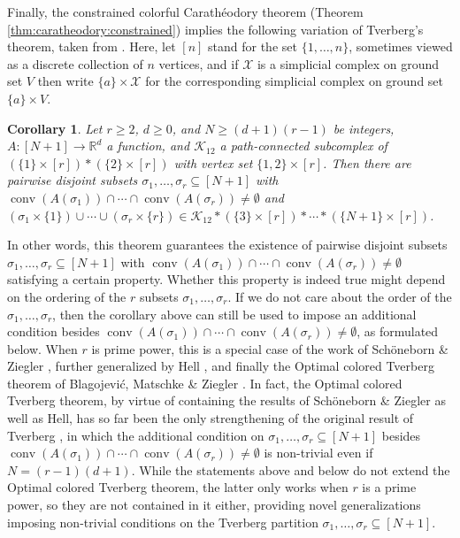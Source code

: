 \documentclass[a4paper,11pt,reqno, english]{amsart}
\newtheorem{corollary}[theorem]{Corollary}
\theoremstyle{definition}
\theoremstyle{remark}
\newcommand\R{\mathbb R}
\DeclareMathOperator{\conv}{\mathrm{conv}}
\begin{document}
Finally, the constrained colorful Carath\'eodory theorem (Theorem \ref{thm:caratheodory:constrained}) implies the following variation of Tverberg's theorem, taken from \cite[Corollary 1.7]{Blagojevic2025}. Here, let $[n]$ stand for the set $\{1,\ldots,n\}$, sometimes viewed as a discrete collection of $n$ vertices, and if $\mathscr{X}$ is a simplicial complex on ground set $V$ then write $\{a\}\times \mathscr{X}$ for the corresponding simplicial complex on ground set $\{a\}\times V$.
\begin{corollary}\label{crl:new-tverberg}
    Let $r\geq 2$, $d\geq 0$, and $N\geq (d+1)(r-1)$ be integers, $A\colon [N+1]\to\R^d$ a function, and $\mathscr{K}_{12}$ a path-connected subcomplex of $(\{1\}\times[r])*(\{2\}\times[r])$ with vertex set $\{1,2\}\times[r]$. Then there are pairwise disjoint subsets $\sigma_1,\ldots,\sigma_r\subseteq [N+1]$ with $\conv(A(\sigma_1))\cap\cdots\cap\conv(A(\sigma_r))\neq\emptyset$ and $(\sigma_1\times\{1\})\cup\cdots\cup(\sigma_r\times\{r\})\in\mathscr{K}_{12}*(\{3\}\times[r])*\cdots*(\{N+1\}\times [r])$.
\end{corollary}
In other words, this theorem guarantees the existence of pairwise disjoint subsets $\sigma_1,\ldots,\sigma_r\subseteq [N+1]$ with $\conv(A(\sigma_1))\cap\cdots\cap\conv(A(\sigma_r))\neq\emptyset$ satisfying a certain property. Whether this property is indeed true might depend on the ordering of the $r$ subsets $\sigma_1,\ldots,\sigma_r$. If we do not care about the order of the $\sigma_1,\ldots,\sigma_r$, then the corollary above can still be used to impose an additional condition besides $\conv(A(\sigma_1))\cap\cdots\cap\conv(A(\sigma_r))\neq\emptyset$, as formulated below. When $r$ is prime power, this is a special case of the work of Schöneborn \& Ziegler \cite{SchoenebornZiegler2005}, further generalized by Hell \cite{Hell2008}, and finally the Optimal colored Tverberg theorem of Blagojević, Matschke \& Ziegler \cite{Blagojevic2009,Blagojevic2011-2}. In fact, the Optimal colored Tverberg theorem, by virtue of containing the results of Schöneborn \& Ziegler as well as Hell, has so far been the only strengthening of the original result of Tverberg \cite{Tverberg1966}, in which the additional condition on $\sigma_1,\ldots,\sigma_r\subseteq[N+1]$ besides $\conv(A(\sigma_1))\cap\cdots\cap\conv(A(\sigma_r))\neq\emptyset$ is non-trivial even if $N=(r-1)(d+1)$. While the statements above and below do not extend the Optimal colored Tverberg theorem, the latter only works when $r$ is a prime power, so they are not contained in it either, providing novel generalizations imposing non-trivial conditions on the Tverberg partition $\sigma_1,\ldots,\sigma_r\subseteq[N+1]$.
\end{document}
